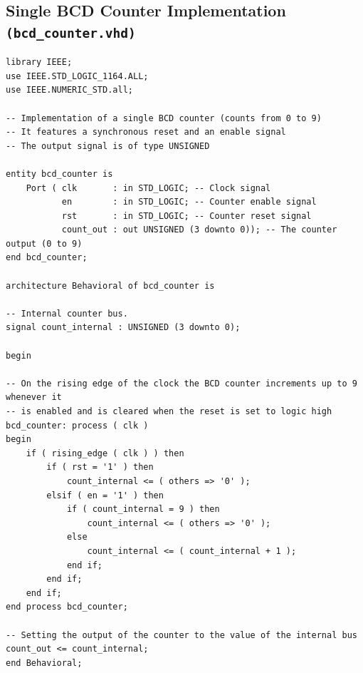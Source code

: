 \documentclass[10pt]{article}
\begin{document}
\subsection{Single BCD Counter Implementation \texttt{(bcd\_counter.vhd)}}
\begin{verbatim}
library IEEE;
use IEEE.STD_LOGIC_1164.ALL;
use IEEE.NUMERIC_STD.all;

-- Implementation of a single BCD counter (counts from 0 to 9)
-- It features a synchronous reset and an enable signal
-- The output signal is of type UNSIGNED

entity bcd_counter is
    Port ( clk       : in STD_LOGIC; -- Clock signal
           en        : in STD_LOGIC; -- Counter enable signal
           rst       : in STD_LOGIC; -- Counter reset signal
           count_out : out UNSIGNED (3 downto 0)); -- The counter output (0 to 9)
end bcd_counter;

architecture Behavioral of bcd_counter is

-- Internal counter bus.
signal count_internal : UNSIGNED (3 downto 0);

begin

-- On the rising edge of the clock the BCD counter increments up to 9 whenever it 
-- is enabled and is cleared when the reset is set to logic high
bcd_counter: process ( clk )
begin
    if ( rising_edge ( clk ) ) then
        if ( rst = '1' ) then
            count_internal <= ( others => '0' );
        elsif ( en = '1' ) then 
            if ( count_internal = 9 ) then
                count_internal <= ( others => '0' );
            else
                count_internal <= ( count_internal + 1 );
            end if;
        end if;
    end if;  
end process bcd_counter;

-- Setting the output of the counter to the value of the internal bus
count_out <= count_internal;
end Behavioral;
\end{verbatim}
\newpage
\end{document}
